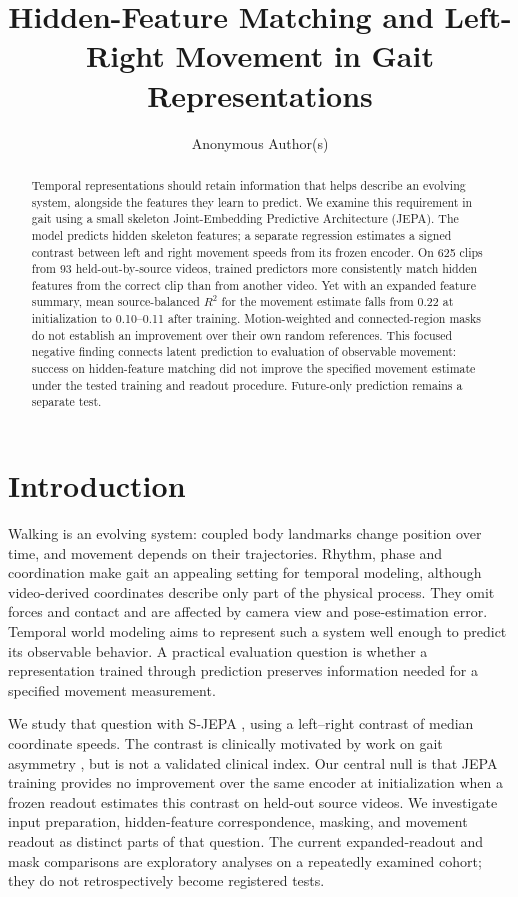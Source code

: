 \documentclass{article}
\title{Hidden-Feature Matching and Left-Right Movement in Gait Representations}
\author{Anonymous Author(s)}
\begin{document}
\maketitle
\begin{abstract}
Temporal representations should retain information that helps describe
an evolving system, alongside the features they learn to predict. We
examine this requirement in gait using a small skeleton Joint-Embedding
Predictive Architecture (JEPA). The model predicts hidden skeleton
features; a separate regression estimates a signed contrast between left
and right movement speeds from its frozen encoder. On 625 clips from 93
held-out-by-source videos, trained predictors more consistently match
hidden features from the correct clip than from another video. Yet with
an expanded feature summary, mean source-balanced \(R^2\) for the
movement estimate falls from 0.22 at initialization to 0.10--0.11 after
training. Motion-weighted and connected-region masks do not establish an
improvement over their own random references. This focused negative
finding connects latent prediction to evaluation of observable movement:
success on hidden-feature matching did not improve the specified
movement estimate under the tested training and readout procedure.
Future-only prediction remains a separate test.
\end{abstract}
\section{Introduction}\label{introduction}

Walking is an evolving system: coupled body landmarks change position
over time, and movement depends on their trajectories. Rhythm, phase and
coordination make gait an appealing setting for temporal modeling,
although video-derived coordinates describe only part of the physical
process. They omit forces and contact and are affected by camera view
and pose-estimation error. Temporal world modeling aims to represent
such a system well enough to predict its observable behavior. A
practical evaluation question is whether a representation trained
through prediction preserves information needed for a specified movement
measurement.

We study that question with S-JEPA \citep{sjepa}, using a left--right
contrast of median coordinate speeds. The contrast is clinically
motivated by work on gait asymmetry \citep{stroke}, but is not a
validated clinical index. Our central null is that JEPA training
provides no improvement over the same encoder at initialization when a
frozen readout estimates this contrast on held-out source videos. We
investigate input preparation, hidden-feature correspondence, masking,
and movement readout as distinct parts of that question. The current
expanded-readout and mask comparisons are exploratory analyses on a
repeatedly examined cohort; they do not retrospectively become
registered tests.
\end{document}
